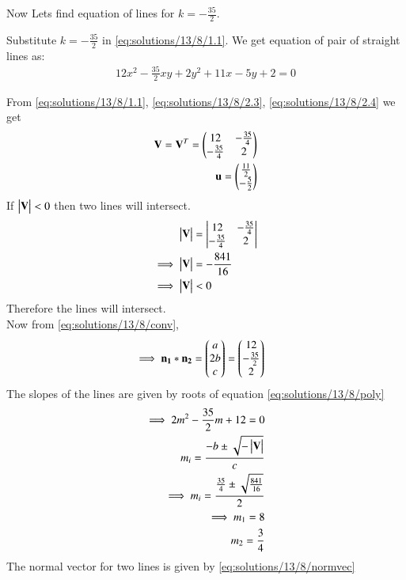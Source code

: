 Now Lets find equation of lines for $k=-\frac{35}{2}$.

Substitute $k=-\frac{35}{2}$ in \eqref{eq:solutions/13/8/1.1}. We get equation of pair of straight lines as:
\begin{align}
    12x^2-\frac{35}{2}xy+2y^2+11x-5y+2=0
\end{align}

From \eqref{eq:solutions/13/8/1.1}, \eqref{eq:solutions/13/8/2.3}, \eqref{eq:solutions/13/8/2.4} we get
\begin{align}
    \mathbf{V}=\mathbf{V}^T=\begin{pmatrix}12 & -\frac{35}{4} \\ -\frac{35}{4} & 2\end{pmatrix}\label{eq:solutions/13/8/2.48}\\
    \mathbf{u}=\begin{pmatrix}\frac{11}{2} \\ -\frac{5}{2}\end{pmatrix}\label{eq:solutions/13/8/2.49}
\end{align}
If $\begin{vmatrix}\mathbf{V}\end{vmatrix}<0$ then two lines will intersect.
\begin{align}
    \begin{vmatrix}\mathbf{V}\end{vmatrix}&=\begin{vmatrix}12 & -\frac{35}{4} \\ -\frac{35}{4} & 2\end{vmatrix}\\
    \implies\begin{vmatrix}\mathbf{V}\end{vmatrix}&=-\frac{841}{16}\\
    \implies\begin{vmatrix}\mathbf{V}\end{vmatrix}&<0
\end{align}
Therefore the lines will intersect.\\
Now from \eqref{eq:solutions/13/8/conv},
\begin{align}
    \implies\mathbf{n_1}*\mathbf{n_2}&=\begin{pmatrix}a \\ 2b \\c\end{pmatrix}=\begin{pmatrix}12\\-\frac{35}{2}\\2\end{pmatrix}\label{eq:solutions/13/8/conv2}
\end{align}
The slopes of the lines are given by roots of equation \eqref{eq:solutions/13/8/poly}
\begin{align}
    \implies 2m^2-\frac{35}{2}m+12=0\\
    m_i=\frac{-b\pm{\sqrt{-\ensuremath{\begin{vmatrix}\mathbf{V}\end{vmatrix}}}}}{c}\\
    \implies m_i=\frac{\frac{35}{4}\pm{\sqrt{\frac{841}{16}}}}{2}\\
    \implies m_1=8\\
     m_2=\frac{3}{4}
\end{align}
The normal vector for two lines is given by \eqref{eq:solutions/13/8/normvec}
